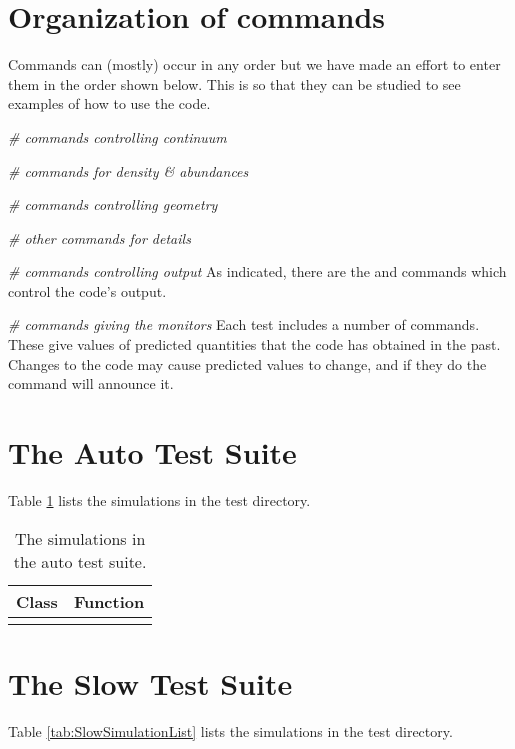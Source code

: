 \section{Organization of commands}

Commands can (mostly) occur in any order but we have made an effort to
enter them in the order shown below.
This is so that they can be studied to see examples of how to
use the code.

\emph{\# commands controlling continuum}

\emph{\# commands for density \& abundances}

\emph{\# commands controlling geometry}

\emph{\# other commands for details}

\emph{\# commands controlling output}
As indicated, there are the  and  commands
which control the code's output.

\emph{\# commands giving the monitors}
Each test includes a number of  commands.
These give values of predicted quantities that the code has
obtained in the past.
Changes to the code may cause predicted values to change,
and if they do the  command will
announce it.

\section{The Auto Test Suite}

Table \ref{tab:AutoSimulationList} lists the simulations in the 
 test directory.

\begin{table}
\centering
\caption{
The simulations in the auto test suite.}
\begin{tabular}{ c c  }
\hline
Class & Function \\
\hline

\hline
\label{tab:AutoSimulationList}
\end{tabular}
\end{table}



\section{The Slow Test Suite}

Table \ref{tab:SlowSimulationList} lists the simulations in the
 test directory.

